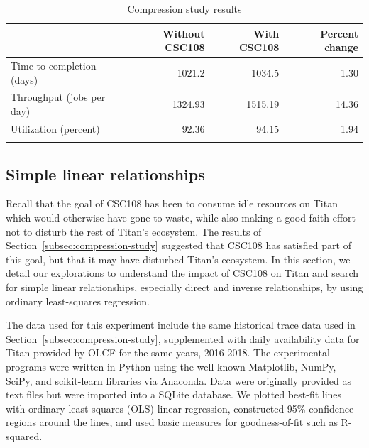 \begin{table}
\caption{Compression study results}
\label{tab:compression-results}       %
\begin{tabular}{lrrr}
\hline\noalign{\smallskip}
\phantom{booga}     &   Without CSC108  &   With CSC108 &   Percent change  \\
\hline\noalign{\smallskip}
Time to completion (days)           &   1021.2  &   1034.5  &   1.30        \\
Throughput (jobs per day)           &   1324.93 &   1515.19 &   14.36       \\
Utilization (percent)               &   92.36   &   94.15   &   1.94        \\
\noalign{\smallskip}\hline
\end{tabular}
\end{table}


\subsection{Simple linear relationships}
\label{subsec:simple-linear-relationships}


Recall that the goal of CSC108 has been to consume idle resources on Titan
which would otherwise have gone to waste, while also making a good faith effort
not to disturb the rest of Titan's ecosystem. The results of
Section~\ref{subsec:compression-study} suggested that CSC108 has satisfied part
of this goal, but that it may have disturbed Titan's ecosystem. In this
section, we detail our explorations to understand the impact of CSC108 on Titan
and search for simple linear relationships, especially direct and inverse
relationships, by using ordinary least-squares regression.

The data used for this experiment include the same historical trace data used
in Section~\ref{subsec:compression-study}, supplemented with daily availability
data for Titan provided by OLCF for the same years, 2016-2018. The experimental
programs were written in Python using the well-known Matplotlib, NumPy, SciPy,
and scikit-learn libraries via Anaconda. Data were originally provided as text
files but were imported into a SQLite database. We plotted best-fit lines with
ordinary least squares (OLS) linear regression, constructed 95\% confidence
regions around the lines, and used basic measures for goodness-of-fit such as
R-squared.

